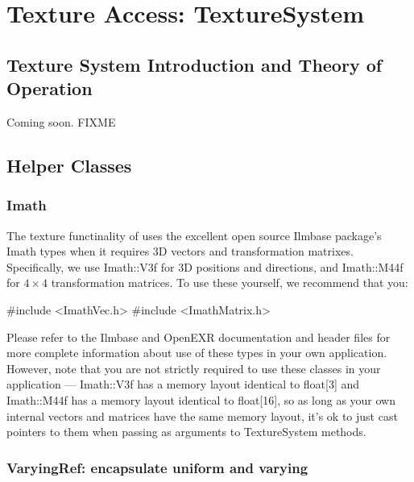 \chapter{Texture Access: {\cf TextureSystem}}
\label{chap:texturesystem}

\def\TextureSystem{{\kw TextureSystem}\xspace}
\def\TextureOptions{{\kw TextureOptions}\xspace}


\section{Texture System Introduction and Theory of Operation}
\label{sec:texturesys:intro}

Coming soon.
FIXME

\section{Helper Classes}
\label{sec:texturesys:helperclasses}

\subsection{Imath}

The texture functinality of \product uses the excellent open source
{\cf Ilmbase} package's {\cf Imath} types when it requires 3D vectors
and transformation matrixes.  Specifically, we use {\cf Imath::V3f}
for 3D positions and directions, and {\cf Imath::M44f} for $4 \times 4$
transformation matrices.  To use these yourself, we recommend that you:

\begin{code}
    #include <ImathVec.h>
    #include <ImathMatrix.h>
\end{code}

Please refer to the {\cf Ilmbase} and {\cf OpenEXR}
documentation and header files for more complete information about
use of these types in your own application.  However, note that you
are not strictly required to use these classes in your application ---
{\cf Imath::V3f} has a memory layout identical to {\cf float[3]}
and {\cf Imath::M44f} has a memory layout identical to {\cf float[16]},
so as long as your own internal vectors and matrices have the same
memory layout, it's ok to just cast pointers to them when passing
as arguments to \TextureSystem methods.

\subsection{{\cf VaryingRef}: encapsulate uniform and varying}

